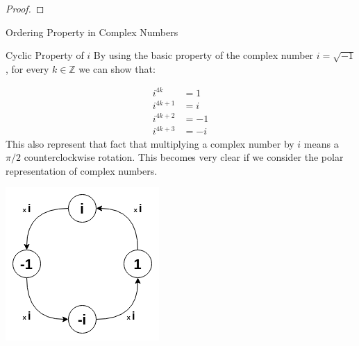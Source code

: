 \begin{proof}

\end{proof}


\begin{example}{Ordering Property in Complex Numbers}

\end{example}

\begin{example}{Cyclic Property of $i$}
By using the basic property of the complex number $i = \sqrt{-1}$, for every $k \in \mathbb{Z}$ we can show that:

\begin{align*}
i^{4k} &= 1 \\
i^{4k+1} &= i \\
i^{4k+2} &= -1 \\
i^{4k+3} &= -i
\end{align*}
This also represent that fact that multiplying a complex number by $i$ means a $\pi/2$ counterclockwise rotation. This becomes very clear if we consider the polar representation of complex numbers.

\centering
\includegraphics[scale=0.4]{Images/fig_CyclicProperty.png}

\end{example}



